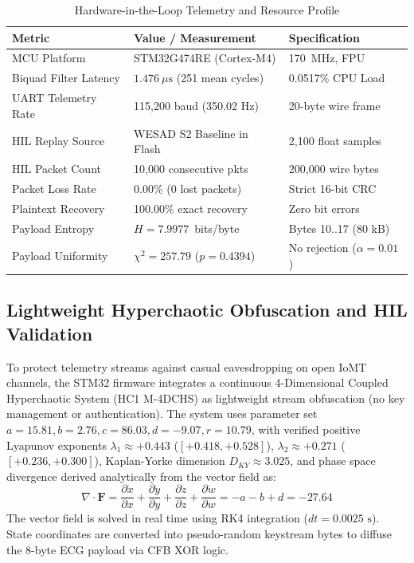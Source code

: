 \documentclass[preprint,12pt,3p]{elsarticle}
\begin{document}
\begin{table}[!t]
\centering
\caption{Hardware-in-the-Loop Telemetry and Resource Profile}
\label{tab:hw_profile}
\begin{tabular*}{\linewidth}{@{\extracolsep{\fill}}lll@{}}
\toprule
\textbf{Metric} & \textbf{Value / Measurement} & \textbf{Specification} \\
\midrule
MCU Platform         & STM32G474RE (Cortex-M4) & 170~MHz, FPU \\
Biquad Filter Latency& $1.476~\mu\text{s}$ (251 mean cycles) & 0.0517\% CPU Load \\
UART Telemetry Rate  & 115,200 baud (350.02 Hz)& 20-byte wire frame \\
HIL Replay Source    & WESAD S2 Baseline in Flash & 2,100 float samples \\
HIL Packet Count     & 10,000 consecutive pkts & 200,000 wire bytes \\
Packet Loss Rate     & 0.00\% (0 lost packets) & Strict 16-bit CRC \\
Plaintext Recovery   & 100.00\% exact recovery & Zero bit errors \\
Payload Entropy      & $H = 7.9977$~bits/byte  & Bytes 10..17 (80 kB) \\
Payload Uniformity   & $\chi^2 = 257.79$ ($p=0.4394$) & No rejection ($\alpha=0.01$) \\
\bottomrule
\end{tabular*}
\end{table}

\subsection{Lightweight Hyperchaotic Obfuscation and HIL Validation}
To protect telemetry streams against casual eavesdropping on open IoMT channels, the STM32 firmware integrates a continuous 4-Dimensional Coupled Hyperchaotic System (HC1 M-4DCHS) as lightweight stream obfuscation (no key management or authentication). The system uses parameter set $a=15.81, b=2.76, c=86.03, d=-9.07, r=10.79$, with verified positive Lyapunov exponents $\lambda_1 \approx +0.443$ ($[+0.418, +0.528]$), $\lambda_2 \approx +0.271$ ($[+0.236, +0.300]$), Kaplan-Yorke dimension $D_{KY} \approx 3.025$, and phase space divergence derived analytically from the vector field as:
\begin{equation}
    \nabla \cdot \mathbf{F} = \frac{\partial \dot{x}}{\partial x} + \frac{\partial \dot{y}}{\partial y} + \frac{\partial \dot{z}}{\partial z} + \frac{\partial \dot{w}}{\partial w} = -a - b + d = -27.64
\end{equation}
The vector field is solved in real time using RK4 integration ($dt = 0.0025\text{ s}$). State coordinates are converted into pseudo-random keystream bytes to diffuse the 8-byte ECG payload via CFB XOR logic.
\end{document}
